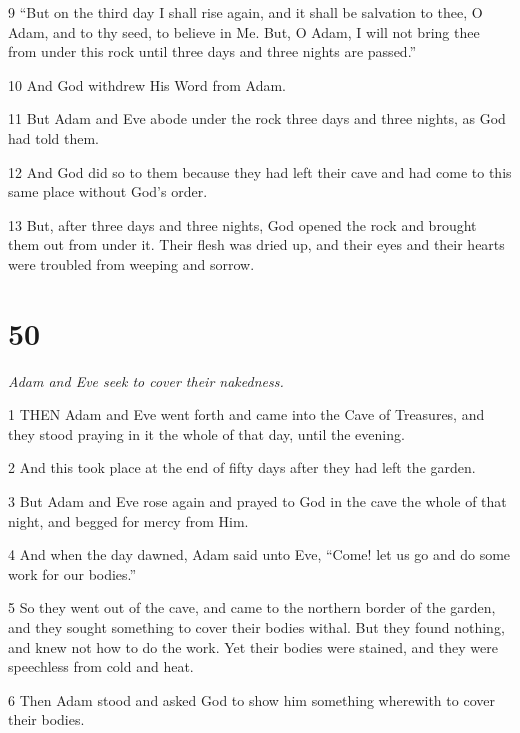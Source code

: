 \par 9 “But on the third day I shall rise again, and it shall be salvation to thee, O Adam, and to thy seed, to believe in Me. But, O Adam, I will not bring thee from under this rock until three days and three nights are passed.”

\par 10 And God withdrew His Word from Adam.

\par 11 But Adam and Eve abode under the rock three days and three nights, as God had told them.

\par 12 And God did so to them because they had left their cave and had come to this same place without God's order.

\par 13 But, after three days and three nights, God opened the rock and brought them out from under it. Their flesh was dried up, and their eyes and their hearts were troubled from weeping and sorrow.

\chapter{50}

\par \textit{Adam and Eve seek to cover their nakedness.}

\par 1 THEN Adam and Eve went forth and came into the Cave of Treasures, and they stood praying in it the whole of that day, until the evening.

\par 2 And this took place at the end of fifty days after they had left the garden.

\par 3 But Adam and Eve rose again and prayed to God in the cave the whole of that night, and begged for mercy from Him.

\par 4 And when the day dawned, Adam said unto Eve, “Come! let us go and do some work for our bodies.”

\par 5 So they went out of the cave, and came to the northern border of the garden, and they sought something to cover their bodies withal. But they found nothing, and knew not how to do the work. Yet their bodies were stained, and they were speechless from cold and heat.

\par 6 Then Adam stood and asked God to show him something wherewith to cover their bodies.

